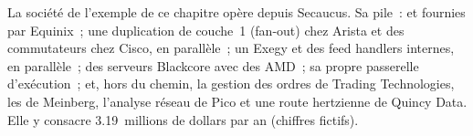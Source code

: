 La société de l'exemple de ce chapitre opère depuis Secaucus. Sa pile~:  et  fournies par Equinix~; une duplication de couche~1 (fan-out) chez Arista
et des commutateurs chez Cisco, en parallèle~; un  Exegy et des feed handlers internes, en parallèle~; des serveurs Blackcore avec des 
AMD~; sa propre passerelle d'exécution~; et, hors du chemin, la gestion des ordres de Trading Technologies, les  de Meinberg, l'analyse réseau
de Pico et une route hertzienne de Quincy Data. Elle y consacre 3.19~millions de dollars par an (chiffres fictifs).

